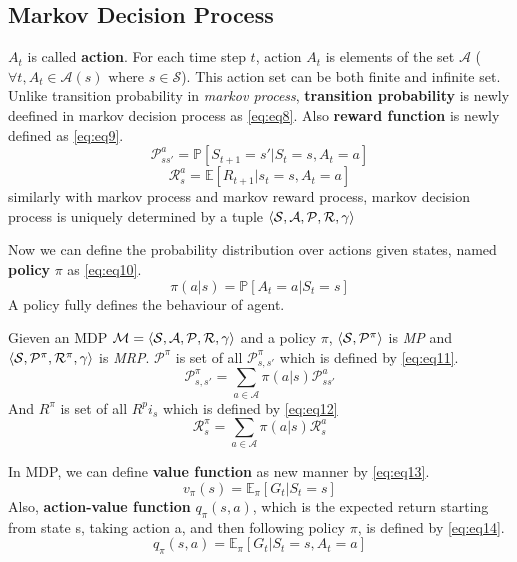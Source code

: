 \documentclass[
	10pt, %
]{article}
\def\n{\newline}
\newcommand{\mbb}[1]{\mathbb{#1}}
\newcommand{\mc}[1]{\mathcal{#1}}
\newcommand{\tb}[1]{\textbf{#1}}
\newcommand{\ti}[1]{\textit{#1}}
\numberwithin{equation}{subsection} %
\begin{document}
\subsection{Markov Decision Process}
$A_t$ is called \tb{action}. For each time step $t$, action $A_t$ is elements of the set $\mc{A}$ ($\forall t, A_t \in \mc{A}(s) \text{ where } s \in \mc{S}$). This action set can be both finite and infinite set. Unlike transition probability in \ti{markov process}, \tb{transition probability} is newly deefined in markov decision process as \cref{eq:eq8}. Also \tb{reward function} is newly defined as \cref{eq:eq9}.
\begin{equation} \label{eq:eq8}
    \mc{P}_{ss'}^a = \mbb{P}[S_{t+1}=s'|S_t=s, A_t=a]
\end{equation}
\begin{equation} \label{eq:eq9}
    \mc{R}_{s}^a = \mbb{E}[R_{t+1}|s_{t}=s,A_t=a]
\end{equation}
similarly with markov process and markov reward process, markov decision process is uniquely determined by a tuple $\braket{\mc{S}, \mc{A}, \mc{P}, \mc{R}, \gamma}$

Now we can define the probability distribution over actions given states, named \tb{policy} $\pi$ as \cref{eq:eq10}.
\begin{equation} \label{eq:eq10}
    \pi(a|s) = \mbb{P}[A_t=a|S_t=s]
\end{equation}
A policy fully defines the behaviour of agent.
\n

Gieven an MDP $\mc{M}=\braket{\mc{S, A, P, R}, \gamma}$ and a policy $\pi$, $\braket{\mc{S}, \mc{P}^\pi}$ is \ti{MP} and $\braket{\mc{S},\mc{P}^\pi, \mc{R}^\pi, \gamma}$ is \ti{MRP}. $\mc{P}^\pi$ is set of all $\mc{P}^\pi_{s,s'}$ which is defined by \cref{eq:eq11}.
\begin{equation} \label{eq:eq11}
    \mc{P}^\pi_{s,s'} = \sum_{a \in \mc{A}}\pi(a|s)\mc{P}^a_{ss'}
\end{equation}
And $R^\pi$ is set of all $R^pi_s$ which is defined by \cref{eq:eq12}
\begin{equation} \label{eq:eq12}
    \mc{R}^\pi_s = \sum_{a \in \mc{A}}\pi(a|s)\mc{R}^a_s
\end{equation}
\n

In MDP, we can define \tb{value function} as new manner by \cref{eq:eq13}.
\begin{equation} \label{eq:eq13}
    v_\pi(s) = \mbb{E}_\pi[G_t|S_t=s]
\end{equation}
Also, \tb{action-value function} $q_\pi(s,a)$, which is the expected return starting from state s, taking action a, and then following policy $\pi$, is defined by \cref{eq:eq14}.
\begin{equation} \label{eq:eq14}
    q_\pi(s,a) = \mbb{E}_\pi[G_t|S_t=s, A_t=a]
\end{equation}
\n
\end{document}
